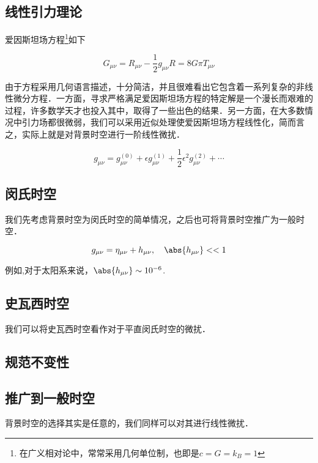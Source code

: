 
\begin{issues}
\issueMissDepend
\issueDraft
\end{issues}



\subsection{线性引力理论}
爱因斯坦场方程\footnote{在广义相对论中，常常采用几何单位制，也即是$c=G=k_B=1$}如下

\begin{equation}
G_{\mu \nu} = R_{\mu \nu} - \frac{1}{2}g_{\mu\nu}R = 8 G\pi T_{\mu\nu}
\end{equation}

由于方程采用几何语言描述，十分简洁，并且很难看出它包含着一系列复杂的非线性微分方程．一方面，寻求严格满足爱因斯坦场方程的特定解是一个漫长而艰难的过程，许多数学天才也投入其中，取得了一些出色的结果．另一方面，在大多数情况中引力场都很微弱，我们可以采用近似处理使爱因斯坦场方程线性化，简而言之，实际上就是对背景时空进行一阶线性微扰．

\begin{equation}
g_{\mu\nu}=g^{(0)}_{\mu\nu}+\epsilon g^{(1)}_{\mu\nu} + \frac{1}{2}\epsilon^2 g^{(2)}_{\mu\nu}+\cdots
\end{equation}


\subsection{闵氏时空}

我们先考虑背景时空为闵氏时空的简单情况，之后也可将背景时空推广为一般时空．

\begin{equation}
g_{\mu\nu} = \eta_{\mu\nu} + h_{\mu\nu},\quad \abs{h_{\mu\nu}}<<1
\end{equation}

例如,对于太阳系来说，$\abs{h_{\mu\nu}} \sim 10^{-6}$.


\subsection{史瓦西时空}

我们可以将史瓦西时空看作对于平直闵氏时空的微扰．


\subsection{规范不变性}


\subsection{推广到一般时空}

背景时空的选择其实是任意的，我们同样可以对其进行线性微扰．

